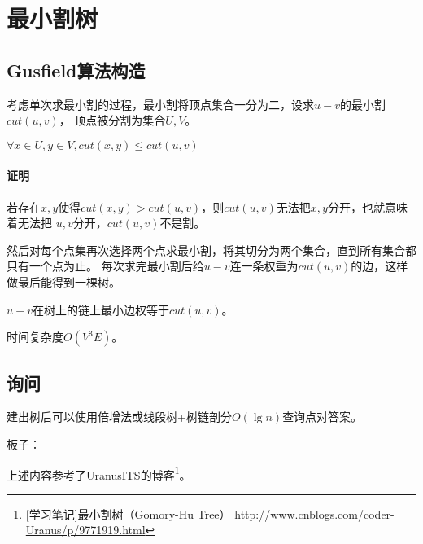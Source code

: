 \section{最小割树}
\subsection{Gusfield算法构造}

考虑单次求最小割的过程，最小割将顶点集合一分为二，设求$u-v$的最小割$cut(u,v)$，
顶点被分割为集合$U,V$。
\begin{lemma}
	$\forall x\in U,y\in V,cut(x,y)\leq cut(u,v)$
\end{lemma}
\paragraph{证明}
若存在$x,y$使得$cut(x,y)>cut(u,v)$，则$cut(u,v)$无法把$x,y$分开，也就意味着无法把
$u,v$分开，$cut(u,v)$不是割。

然后对每个点集再次选择两个点求最小割，将其切分为两个集合，直到所有集合都只有一个点为止。
每次求完最小割后给$u-v$连一条权重为$cut(u,v)$的边，这样做最后能得到一棵树。
\begin{theorem}
	$u-v$在树上的链上最小边权等于$cut(u,v)$。
\end{theorem}
时间复杂度$O(V^3E)$。
\subsection{询问}
建出树后可以使用倍增法或线段树+树链剖分$O(\lg n)$查询点对答案。

板子：

上述内容参考了UranusITS的博客\footnote{
	[学习笔记]最小割树（Gomory-Hu Tree）
	\url{http://www.cnblogs.com/coder-Uranus/p/9771919.html}
}。
